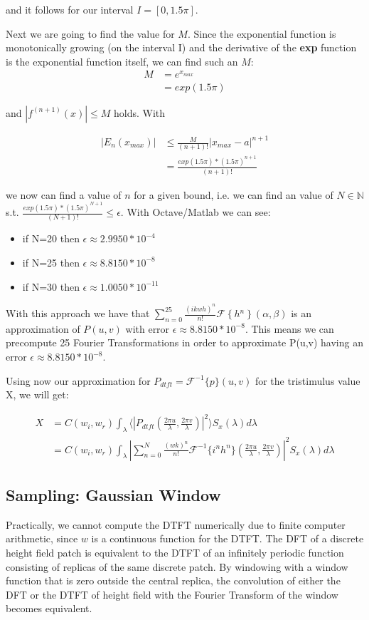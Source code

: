 and it follows for our interval $I=[0,1.5\pi]$. 

Next we are going to find the value for $M$. Since the exponential function is monotonically growing (on the interval I) and the derivative of the \textbf{exp} function is the exponential function itself, we can find such an $M$: 
\begin{align*}
 M
 &=e^{x_{max}} \\
 &=exp(1.5\pi)
\end{align*}

and $|f^{(n+1)}(x)|\leq M$ holds. With 

\begin{align*}
|E_{n}(x_{max})|
 &\leq\frac{M}{(n+1)!}|x_{max}-a|^{n+1} \\
 &= \frac{exp(1.5\pi)*(1.5\pi)^{n+1}}{(n+1)!}
\end{align*}

we now can find a value of $n$ for a given bound, i.e. we can find an value of $N\mathbb{\in N}$ s.t. $\frac{exp(1.5\pi)*(1.5\pi)^{N+1}}{(N+1)!}\leq\epsilon$.
With Octave/Matlab we can see: 
\begin{itemize}
\item if N=20 then $\epsilon\approx2.9950*10^{-4}$
\item if N=25 then $\epsilon\approx8.8150*10^{-8}$
\item if N=30 then $\epsilon\approx1.0050*10^{-11}$
\end{itemize}

With this approach we have that $\sum_{n=0}^{25}\frac{(ikwh)^{n}}{n!}\mathcal{F}\left\{ h{}^{n}\right\} (\alpha,\beta)$ is
an approximation of $P(u,v)$ with error $\epsilon\approx8.8150*10^{-8}$. This means we can precompute 25 Fourier Transformations in order to approximate P(u,v) having an error $\epsilon\approx8.8150*10^{-8}$. 

Using now our approximation for $P_{dtft} = \mathcal{F}^{-1}\{p\}(u,v)$ for the tristimulus value X, we will get:

\begin{align*}
X 
& = C(w_i,w_r) \int_{\lambda} \langle \left|P_{dtft}(\frac{2\pi u}{\lambda}, \frac{2\pi v}{\lambda})\right|^2\rangle S_x(\lambda)d\lambda \\
& = C(w_i,w_r) \int_{\lambda} \left| \sum_{n=0}^N \frac{(wk)^n}{n!} \mathcal{F}^{-1}\{i^n h^n\}(\frac{2\pi u}{\lambda}, \frac{2\pi v}{\lambda})\right|^2 S_x(\lambda)d\lambda
\end{align*}

\subsection{Sampling: Gaussian Window}
Practically, we cannot compute the DTFT numerically due to finite computer arithmetic, since $w$ is a continuous function for the DTFT. 
The DFT of a discrete height field patch is equivalent to the DTFT of an infinitely periodic function consisting of replicas of the same discrete patch. By windowing with a window function that is zero outside the central replica, the convolution of either the DFT or the DTFT of height field with the Fourier Transform of the window becomes equivalent.

